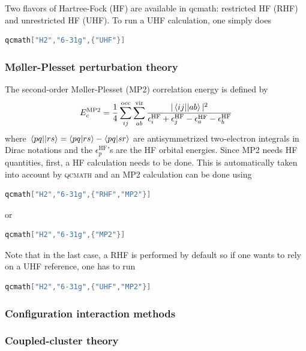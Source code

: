 \documentclass[aip,jcp,reprint,noshowkeys,superscriptaddress]{revtex4-1}
\newcommand{\EcMP}{E_c^{\text{MP2}}}
\newcommand{\eHF}[1]{\epsilon^\text{HF}_{#1}}
\newcommand{\qcmath}{\textsc{qcmath}\xspace}
\begin{document}
Two flavors of Hartree-Fock (HF) are available in qcmath: restricted HF (RHF) and unrestricted HF (UHF). To run a UHF calculation, one simply does
\begin{lstlisting}[extendedchars=true,language=Mathematica]
	qcmath["H2","6-31g",{"UHF"}]
\end{lstlisting}

\subsubsection*{M\o{}ller-Plesset perturbation theory}
The second-order M\o{}ller-Plesset (MP2) correlation energy is defined by 
\begin{equation}
	\EcMP = \frac{1}{4} \sum_{ij}^{\text{occ}} \sum_{ab}^{\text{vir}} \frac{ |\mel{ij}{}{ab}|^2 }{\eHF{i} + \eHF{j} - \eHF{a} - \eHF{b}}
\end{equation}
where $\mel{pq}{}{rs} = \braket{pq}{rs} - \braket{pq}{sr}$ are antisymmetrized two-electron integrals in Dirac notations and the $\eHF{p}$'s are the HF orbital energies.
Since MP2 needs HF quantities, first, a HF calculation needs to be done. This is automatically taken into account by \qcmath and an MP2 calculation can be done using 
\begin{lstlisting}[extendedchars=true,language=Mathematica]
	qcmath["H2","6-31g",{"RHF","MP2"}]
\end{lstlisting}
or 
\begin{lstlisting}[extendedchars=true,language=Mathematica]
	qcmath["H2","6-31g",{"MP2"}]
\end{lstlisting}
Note that in the last case, a RHF is performed by default so if one wants to rely on a UHF reference, one has to run
\begin{lstlisting}[extendedchars=true,language=Mathematica]
	qcmath["H2","6-31g",{"UHF","MP2"}]
\end{lstlisting}

\subsubsection*{Configuration interaction methods}

\subsubsection*{Coupled-cluster theory}
\end{document}
